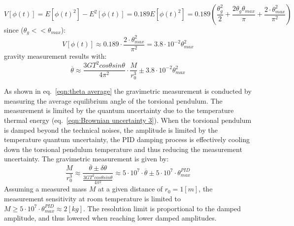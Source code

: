 \documentclass[\main/master.tex]{subfiles}
\begin{document}
\begin{equation}
V[\phi(t)] = E[\phi(t)^2] - E^2[\phi(t)] =0.189 E [\phi(t)^2] = 0.189 (\frac{\theta_g^2}{2} +\frac{2 \theta_g\theta_{max}}{\pi}+\frac{2\cdot \theta_{max}^2}{\pi^2} )
\end{equation}
 since ($\theta_g<<\theta_{max}$):
\begin{equation}
V[\phi(t)] \approx 0.189\cdot \frac{2\cdot \theta_{max}^2}{\pi^2} =  3.8\cdot 10^{-2} \theta_{max}^2
\end{equation}
gravity measurement results with:
\begin{equation}
\overline{\theta}  \approx \frac{3GT^2cos\theta sin\theta}{4\pi^2 } \cdot \frac{M}{r_0^3} \pm 3.8\cdot 10^{-2} \theta_{max}^2 \label{eqn:theta average}
\end{equation} 
\fi


As shown in eq.~\ref{eqn:theta average} the gravimetric measurement is conducted by measuring the average equilibrium angle of the torsional pendulum. The measurement is limited by the quantum uncertainty due to the temperature thermal energy (eq.~\ref{eqn:Brownian uncertainty 3}). When the torsional pendulum is damped beyond the technical noises, the amplitude is limited by the temperature quantum uncertainty, the PID damping process is effectively cooling down the torsional pendulum temperature and thus reducing the measurement uncertainty. The gravimetric measurement is given by:
\begin{equation}
\frac{M}{r_0^3} \approx \frac{\overline{\theta}\pm \delta\theta}{\frac{3GT^2cos\theta sin\theta}{4\pi^2 }} \approx 5\cdot 10^{7}\cdot \overline{\theta}\pm 5\cdot 10^{7}\cdot \theta_{max}^{PID}
\label{eqn:measurement resolution}
\end{equation}
Assuming a measured mass $M$ at a given distance of $r_0 = 1[m]$, the measurement sensitivity at room temperature is limited to $M\geq 5\cdot 10^{7}\cdot \theta_{max}^{PID}\approx 2[kg]$. The resolution limit is proportional to the damped amplitude, and thus lowered when reaching lower damped amplitudes.
\end{document}
